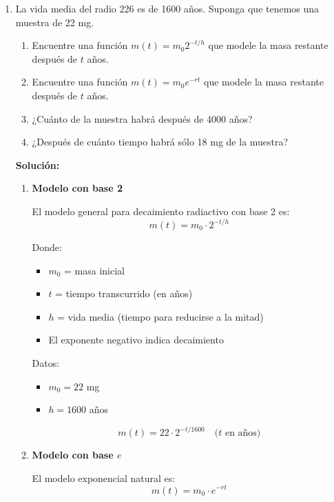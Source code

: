 \documentclass[12pt]{article}
\begin{document}
\begin{enumerate}[label=\alph*.-]
    \item La vida media del radio 226 es de 1600 años. Suponga que tenemos una muestra de 22 mg.
    \begin{enumerate}[label=\roman*.]
        \item Encuentre una función $m(t) = m_0 2^{-t/h}$ que modele la masa restante después de $t$ años.
        \item Encuentre una función $m(t) = m_0 e^{-rt}$ que modele la masa restante después de $t$ años.
        \item ¿Cuánto de la muestra habrá después de 4000 años?
        \item ¿Después de cuánto tiempo habrá sólo 18 mg de la muestra?
    \end{enumerate}
    
    \textbf{Solución:}
    
    \begin{enumerate}[label=\roman*.]
        \item \textbf{Modelo con base 2}
        
        El modelo general para decaimiento radiactivo con base 2 es:
        \[m(t) = m_0 \cdot 2^{-t/h}\]
        
        Donde:
        \begin{itemize}
            \item $m_0$ = masa inicial
            \item $t$ = tiempo transcurrido (en años)
            \item $h$ = vida media (tiempo para reducirse a la mitad)
            \item El exponente negativo indica decaimiento
        \end{itemize}
        
        Datos:
        \begin{itemize}
            \item $m_0 = 22$ mg
            \item $h = 1600$ años
        \end{itemize}
        
        \[\boxed{m(t) = 22 \cdot 2^{-t/1600}} \quad \text{($t$ en años)}\]
        
        \newpage

        \item \textbf{Modelo con base $e$}
        
        El modelo exponencial natural es:
        \[m(t) = m_0 \cdot e^{-rt}\]
        

\end{enumerate}
\end{enumerate}
\end{document}
